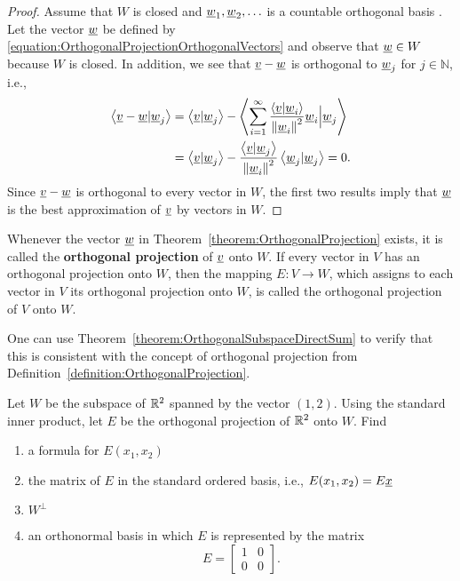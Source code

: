 \begin{proof}
Assume that $W$ is closed and $\underline{w}_1,\underline{w}_2, \ldots$ is a countable orthogonal basis .
Let the vector $\underline{w}$ be defined by \eqref{equation:OrthogonalProjectionOrthogonalVectors} and observe that $\underline{w} \in W$ because $W$ is closed.
In addition, we see that $\underline{v} -\underline{w}$ is orthogonal to $\underline{w}_j$ for $j \in \mathbb{N}$, i.e.,
\begin{equation*}
\begin{split}
\left\langle \underline{v} - \underline{w} | \underline{w}_j \right\rangle
&= \left\langle \underline{v} | \underline{w}_j \right\rangle
- \left\langle \sum_{i=1}^\infty \frac{ \left\langle \underline{v} | \underline{w}_i \right\rangle }{ \left\| \underline{w}_i \right\|^2 } \underline{w}_i \Big| \underline{w}_j \right\rangle \\
&= \left\langle \underline{v} | \underline{w}_j \right\rangle
- \frac{ \left\langle \underline{v} | \underline{w}_j \right\rangle }{ \left\| \underline{w}_i \right\|^2 } \left\langle \underline{w}_j | \underline{w}_j \right\rangle
= 0.
\end{split}
\end{equation*}
Since $\underline{v} - \underline{w}$ is orthogonal to every vector in $W$, the first two results imply that $\underline{w}$ is the best approximation of $\underline{v}$ by vectors in $W$.
\end{proof}

\begin{definition}
Whenever the vector $\underline{w}$ in Theorem~\ref{theorem:OrthogonalProjection} exists, it is called the \textbf{orthogonal projection} of $\underline{v}$ onto $W$.
If every vector in $V$ has an orthogonal projection onto $W$, then the mapping $E \colon V \rightarrow W$, which assigns to each vector in $V$ its orthogonal projection onto $W$, is called the orthogonal projection of $V$ onto $W$.
\end{definition}

One can use Theorem~\ref{theorem:OrthogonalSubspaceDirectSum} to verify that this is consistent with the concept of orthogonal projection from Definition~\ref{definition:OrthogonalProjection}.


\begin{problem}
Let $W$ be the subspace of $\mathbb{R}^2$ spanned by the vector $(1,2)$.
Using the standard inner product, let $E$ be the orthogonal projection of $\mathbb{R}^2$ onto $W$.
Find
\begin{enumerate}
\item a formula for $E(x_1, x_2)$
\item the matrix of $E$ in the standard ordered basis, i.e., $E(x_1, x_2) = E \underline{x}$
\item $W^{\bot}$
\item an orthonormal basis in which $E$ is represented by the matrix
\begin{equation*}
E = \left[ \begin{array}{cc} 1 & 0 \\ 0 & 0 \end{array} \right].
\end{equation*}
\end{enumerate}
\end{problem}


